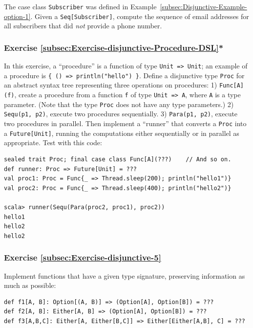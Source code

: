 The case class \lstinline!Subscriber! was defined in Example~\ref{subsec:Disjunctive-Example-option-1}.
Given a \lstinline!Seq[Subscriber]!, compute the sequence of email
addresses for all subscribers that did \emph{not} provide a phone
number.

\subsubsection{Exercise \label{subsec:Exercise-disjunctive-Procedure-DSL}\ref{subsec:Exercise-disjunctive-Procedure-DSL}{*}}

In this exercise, a \textsf{``}procedure\textsf{''} is a function
of type \lstinline!Unit => Unit!; an example of a procedure is \lstinline!{ () => println("hello") }!.
Define a disjunctive type \lstinline!Proc! for an abstract syntax
tree representing three operations on procedures: 1) \lstinline!Func[A](f)!,
create a procedure from a function \lstinline!f! of type \lstinline!Unit => A!,
where \lstinline!A! is a type parameter. (Note that the type \lstinline!Proc!
does not have any type parameters.) 2) \lstinline!Sequ(p1, p2)!,
execute two procedures sequentially. 3) \lstinline!Para(p1, p2)!,
execute two procedures in parallel. Then implement a \textsf{``}runner\textsf{''}
that converts a \lstinline!Proc! into a \lstinline!Future[Unit]!,
running the computations either sequentially or in parallel as appropriate.
Test with this code:
\begin{lstlisting}
sealed trait Proc; final case class Func[A](???)    // And so on.
def runner: Proc => Future[Unit] = ???
val proc1: Proc = Func{_ => Thread.sleep(200); println("hello1")}
val proc2: Proc = Func{_ => Thread.sleep(400); println("hello2")}

scala> runner(Sequ(Para(proc2, proc1), proc2))
hello1
hello2
hello2
\end{lstlisting}


\subsubsection{Exercise \label{subsec:Exercise-disjunctive-5}\ref{subsec:Exercise-disjunctive-5}}

Implement functions that have a given type signature, preserving information
as much as possible: 
\begin{lstlisting}
def f1[A, B]: Option[(A, B)] => (Option[A], Option[B]) = ???
def f2[A, B]: Either[A, B] => (Option[A], Option[B]) = ???
def f3[A,B,C]: Either[A, Either[B,C]] => Either[Either[A,B], C] = ???
\end{lstlisting}


